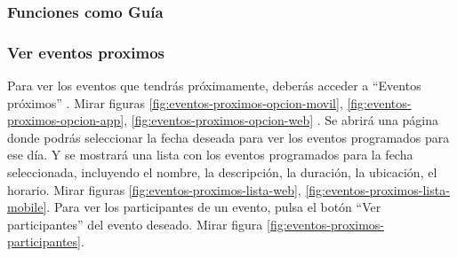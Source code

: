 \newpage
\subsubsection{Funciones como Guía}
\hrulefill

\subsubsection{Ver eventos proximos}
Para ver los eventos que tendrás próximamente, deberás acceder a “Eventos próximos” . Mirar figuras \ref{fig:eventos-proximos-opcion-movil}, \ref{fig:eventos-proximos-opcion-app}, \ref{fig:eventos-proximos-opcion-web} .
Se abrirá una página donde podrás seleccionar la fecha deseada para ver los eventos programados para ese día.
Y se mostrará una lista con los eventos programados para la fecha seleccionada, incluyendo el nombre, la descripción, la duración, la ubicación, el horario. Mirar figuras \ref{fig:eventos-proximos-lista-web}, \ref{fig:eventos-proximos-lista-mobile}.
Para ver los participantes de un evento, pulsa el botón “Ver participantes” del evento deseado. Mirar figura \ref{fig:eventos-proximos-participantes}.

